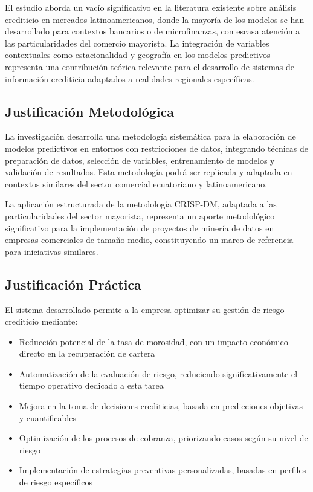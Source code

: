El estudio aborda un vacío significativo en la literatura existente sobre análisis crediticio en mercados latinoamericanos, donde la mayoría de los modelos se han desarrollado para contextos bancarios o de microfinanzas, con escasa atención a las particularidades del comercio mayorista. La integración de variables contextuales como estacionalidad y geografía en los modelos predictivos representa una contribución teórica relevante para el desarrollo de sistemas de información crediticia adaptados a realidades regionales específicas.

\subsection{Justificación Metodológica}

La investigación desarrolla una metodología sistemática para la elaboración de modelos predictivos en entornos con restricciones de datos, integrando técnicas de preparación de datos, selección de variables, entrenamiento de modelos y validación de resultados. Esta metodología podrá ser replicada y adaptada en contextos similares del sector comercial ecuatoriano y latinoamericano.

La aplicación estructurada de la metodología CRISP-DM, adaptada a las particularidades del sector mayorista, representa un aporte metodológico significativo para la implementación de proyectos de minería de datos en empresas comerciales de tamaño medio, constituyendo un marco de referencia para iniciativas similares.

\subsection{Justificación Práctica}

El sistema desarrollado permite a la empresa optimizar su gestión de riesgo crediticio mediante:

\begin{itemize}
    \item Reducción potencial de la tasa de morosidad, con un impacto económico directo en la recuperación de cartera
    
    \item Automatización de la evaluación de riesgo, reduciendo significativamente el tiempo operativo dedicado a esta tarea
    
    \item Mejora en la toma de decisiones crediticias, basada en predicciones objetivas y cuantificables
    
    \item Optimización de los procesos de cobranza, priorizando casos según su nivel de riesgo
    
    \item Implementación de estrategias preventivas personalizadas, basadas en perfiles de riesgo específicos
\end{itemize}

